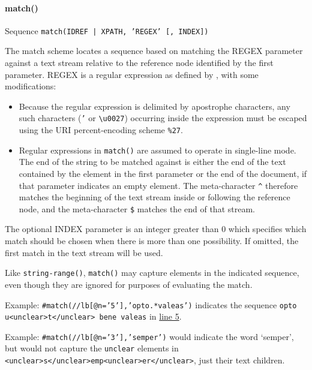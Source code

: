\paragraph[{match()}]{match()}\label{SATSMA}\par
Sequence \texttt{match(IDREF | XPATH, 'REGEX' [, INDEX])}\par
The match scheme locates a sequence based on matching the REGEX parameter against a text stream relative to the reference node identified by the first parameter. REGEX is a regular expression as defined by , with some modifications: \begin{itemize}
\item Because the regular expression is delimited by apostrophe characters, any such characters (\texttt{'} or \texttt{\textbackslash u0027}) occurring inside the expression must be escaped using the URI percent-encoding scheme \texttt{\%27}.
\item Regular expressions in \texttt{match()} are assumed to operate in single-line mode. The end of the string to be matched against is either the end of the text contained by the element in the first parameter or the end of the document, if that parameter indicates an empty element. The meta-character \texttt{\textasciicircum } therefore matches the beginning of the text stream inside or following the reference node, and the meta-character \texttt{\$} matches the end of that stream.
\end{itemize}  The optional INDEX parameter is an integer greater than 0 which specifies which match should be chosen when there is more than one possibility. If omitted, the first match in the text stream will be used.\par
Like \texttt{string-range()}, \texttt{match()} may capture elements in the indicated sequence, even though they are ignored for purposes of evaluating the match.\par
Example: \texttt{\#match(//lb[@n='5'],'opto.*valeas')} indicates the sequence \texttt{opto u<unclear>t</unclear> bene valeas} in \hyperref[SATSXP-ex]{line 5}.\par
Example: \texttt{\#match(//lb[@n='3'],'semper')} would indicate the word ‘semper’, but would not capture the \texttt{unclear} elements in \texttt{<unclear>s</unclear>emp<unclear>er</unclear>}, just their text children.
